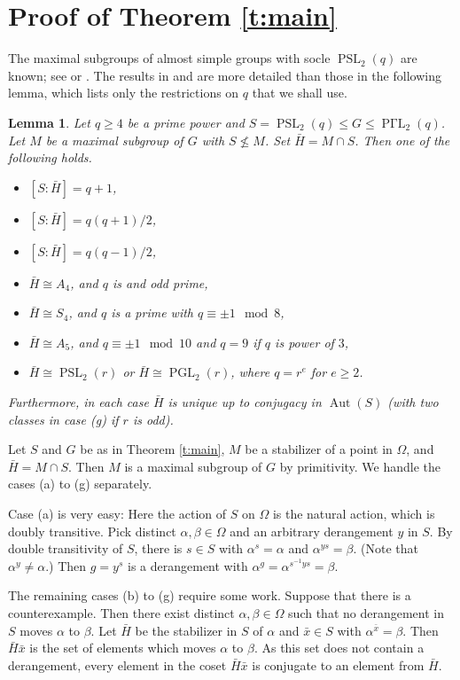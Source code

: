 \documentclass[12pt]{amsart}
\theoremstyle{plain}
\newtheorem{lemma}[theorem]{Lemma}
\theoremstyle{definition}
\numberwithin{equation}{section}
\newcommand{\bx}{\bar{x}}
\newcommand{\bH}{\bar{H}}
\DeclareMathOperator{\PGL}{PGL}
\DeclareMathOperator{\PSL}{PSL}
\DeclareMathOperator{\PGammaL}{P\Gamma L}
\DeclareMathOperator{\aut}{Aut}
\begin{document}
\section{Proof of Theorem \ref{t:main}}
The maximal subgroups of almost simple groups with socle $\PSL_2(q)$
are known; see \cite[Table~8.1, Table~8.2]{bray_etal___maximal} or
\cite{giudici___psl2}. The results in \cite{bray_etal___maximal} and
\cite{giudici___psl2} are more detailed than those in the following
lemma, which lists only the restrictions on $q$ that we shall use.
\begin{lemma}\label{l:giudici}
  Let $q\ge4$ be a prime power and $S=\PSL_2(q)\le
  G\le\PGammaL_2(q)$. Let $M$ be a maximal subgroup of $G$ with
  $S\not\le M$. Set $\bH=M\cap S$. Then one of the following holds.
  \begin{itemize}
  \item[(a)] $[S:\bH] = q+1$,
  \item[(b)] $[S:\bH] = q(q+1)/2$,
  \item[(c)] $[S:\bH] = q(q-1)/2$,
  \item[(d)] $\bH\cong A_4$, and $q$ is and odd prime,
  \item[(e)] $\bH\cong S_4$, and $q$ is a prime with $q\equiv\pm1\mod{8}$,
  \item[(f)] $\bH\cong A_5$, and $q\equiv\pm1\mod{10}$ and $q=9$ if $q$ is
    power of $3$,
  \item[(g)] $\bH\cong\PSL_2(r)$ or $\bH\cong\PGL_2(r)$, where $q=r^e$
    for $e\ge2$.
  \end{itemize}
  Furthermore, in each case $\bH$ is unique up to conjugacy in
  $\aut(S)$ (with two classes in case (g) if $r$ is odd).
\end{lemma}
Let $S$ and $G$ be as in Theorem \ref{t:main}, $M$ be a stabilizer of
a point in $\Omega$, and $\bH=M\cap S$. Then $M$ is a maximal subgroup
of $G$ by primitivity. We handle the cases (a) to (g) separately.

Case (a) is very easy: Here the action of $S$ on $\Omega$ is the
natural action, which is doubly transitive. Pick distinct
$\alpha, \beta\in\Omega$ and an arbitrary derangement $y$ in $S$. By
double transitivity of $S$, there is $s\in S$ with $\alpha^s=\alpha$
and $\alpha^{ys}=\beta$. (Note that $\alpha^y\ne\alpha$.) Then $g=y^s$
is a derangement with $\alpha^g=\alpha^{s^{-1}ys}=\beta$.

The remaining cases (b) to (g) require some work. Suppose that there
is a counterexample. Then there exist distinct
$\alpha, \beta\in\Omega$ such that no derangement in $S$ moves
$\alpha$ to $\beta$. Let $\bH$ be the stabilizer in $S$ of $\alpha$
and $\bx\in S$ with $\alpha^{\bx}=\beta$. Then $\bH\bx$ is the set of
elements which moves $\alpha$ to $\beta$. As this set does not contain
a derangement, every element in the coset $\bH\bx$ is conjugate to an
element from $\bH$.
\end{document}
